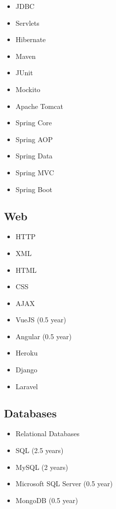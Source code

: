 \documentclass[a4paper,12pt]{article}
\begin{document}
\begin{multicols}{3}
\begin{itemize}
    \item JDBC
    \item Servlets
    \item Hibernate
    \item Maven
    \item JUnit
    \item Mockito
    \item Apache Tomcat
    \item Spring Core 
    \item Spring AOP 
    \item Spring Data 
    \item Spring MVC 
    \item Spring Boot 
\end{itemize}
\end{multicols}

\subsection*{Web}

\begin{multicols}{2}
\begin{itemize}
    \item HTTP
    \item XML
    \item HTML
    \item CSS
    \item AJAX
    \item VueJS (0.5 year)
    \item Angular (0.5 year)
    \item Heroku
    \item Django
    \item Laravel 
\end{itemize}
\end{multicols}

\subsection*{Databases}

\begin{multicols}{2}
\begin{itemize}
    \item Relational Databases
    \item SQL (2.5 years)
    \item MySQL (2 years)
    \item Microsoft SQL Server (0.5 year)
    \item MongoDB (0.5 year)
\end{itemize}
\end{multicols}
\end{document}
